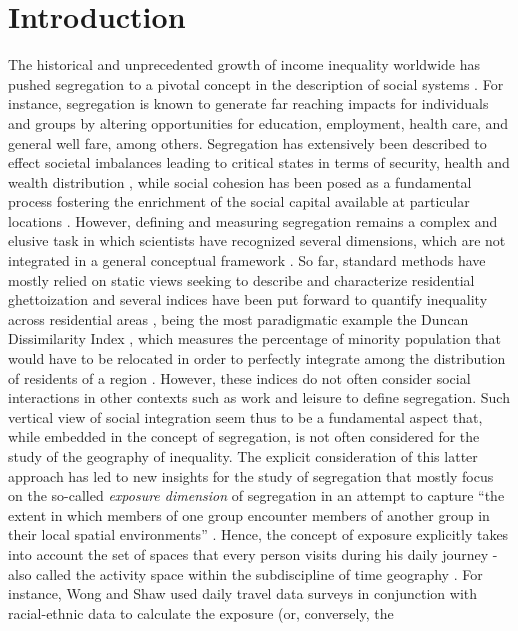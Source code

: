 \documentclass[%
preprint,
 amsmath,amssymb,
pra,
]{revtex4-1}
\begin{document}

\maketitle

\section{Introduction}

The historical and unprecedented growth of income inequality worldwide has pushed segregation to a pivotal concept in the description of social systems \cite{grusky}. For instance, segregation is known to generate far reaching impacts for individuals and groups by altering opportunities for education, employment, health care, and general well fare, among others. Segregation has extensively been described to effect societal imbalances leading to critical states in terms of security, health and wealth distribution \cite{silm2014temporal,cutler1997ghettos,massey1987effect,Garreton2016a}, while social cohesion has been posed as a fundamental process fostering the enrichment of the social capital available at particular locations \cite{farber2013social, coleman1988social, forrest2001social}. However, defining and measuring segregation remains a complex and elusive task in which scientists have recognized several dimensions, which are not integrated in a general conceptual framework \cite{louf2016patterns}. So far, standard methods have mostly relied on static views seeking to describe and characterize residential ghettoization  \cite{yip2016exploring,wong2011measuring} and several indices have been put forward to quantify inequality across residential areas \cite{jones2014redefining}, being the most paradigmatic example the  Duncan Dissimilarity Index \cite{duncan1955methodological}, which measures the percentage of minority population that would have to be relocated in order to perfectly integrate among the distribution of residents of a region \cite{farber2015measuring}. However, these indices do not often consider social interactions in other contexts such as work and leisure to define segregation. Such vertical view of social integration seem thus to be a fundamental aspect that, while embedded in the concept of segregation, is not often considered for the study of the geography of inequality. The explicit consideration of this latter approach has led to new insights for the study of segregation that mostly focus on the so-called \textit{exposure dimension} of segregation in an attempt to capture ``the extent in which members of one group encounter members of another group in their local spatial environments'' \cite{reardon2004measures,massey1988dimensions}. Hence, the concept of exposure explicitly takes into account the set of spaces that every person visits during his daily journey -also called the activity space within the subdiscipline of time geography \cite{thrift1977,Hagerstraand2005}. For instance, Wong and Shaw \cite{wong2011measuring} used daily travel data surveys in conjunction with racial-ethnic data to calculate the exposure (or, conversely, the 
\end{document}
